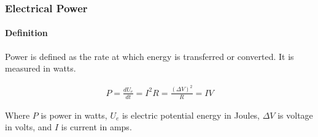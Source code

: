 \subsubsection*{Electrical Power}


\paragraph*{Definition}
Power is defined as the rate at which energy is transferred or converted. It is measured in watts.

\begin{align*}
    P = \frac{dU_e}{dt} = I^2R = \frac{(\Delta V)^2}{R} = IV
\end{align*}

Where $P$ is power in watts, $U_e$ is electric potential energy in Joules, $\Delta V$ is voltage in volts, and $I$ is current in amps.

